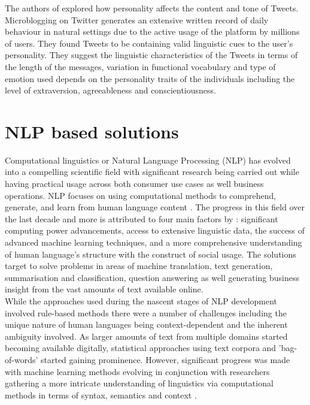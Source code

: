 The authors of \cite{qiuYouAreWhat2012} explored how personality affects the content and tone of Tweets. Microblogging on Twitter generates an extensive written record of daily behaviour in natural settings due to the active usage of the platform by millions of users. They found Tweets to be containing valid linguistic cues to the user's personality. They suggest the linguistic characteristics of the Tweets in terms of the length of the messages, variation in functional vocabulary and type of emotion used depends on the personality traits of the individuals including the level of extraversion, agreeableness and conscientiousness.

\section{NLP based solutions}
Computational linguistics or Natural Language Processing (NLP) has evolved into a compelling scientific field with significant research being carried out while having practical usage across both consumer use cases as well business operations. NLP focuses on using computational methods to comprehend, generate, and learn from human language content \cite{hirschbergAdvancesNaturalLanguage2015}. The progress in this field over the last decade and more is attributed to four main factors by \cite{hirschbergAdvancesNaturalLanguage2015}: significant computing power advancements, access to extensive linguistic data, the success of advanced machine learning techniques, and a more comprehensive understanding of human language's structure with the construct of social usage. The solutions target to solve problems in areas of machine translation, text generation, summarisation and classification, question answering as well generating business insight from the vast amounts of text available online.\\

While the approaches used during the nascent stages of NLP development involved rule-based methods there were a number of challenges including the unique nature of human languages being context-dependent and the inherent ambiguity involved. As larger amounts of text from multiple domains started becoming available digitally, statistical approaches using text corpora and 'bag-of-words' started gaining prominence. However, significant progress was made with machine learning methods evolving in conjunction with researchers gathering a more intricate understanding of linguistics via computational methods in terms of syntax, semantics and context \cite{hirschbergAdvancesNaturalLanguage2015}.\\

